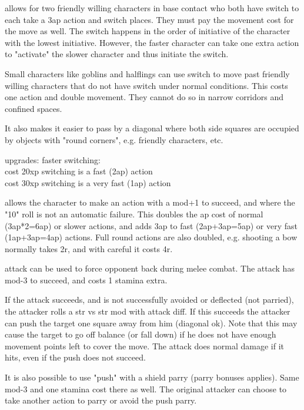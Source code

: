  allows for two friendly willing characters in base contact who both have switch to each take a 3ap action and switch places. They must pay the movement cost for the move as well. The switch happens in the order of initiative of the character with the lowest initiative. However, the faster character can take one extra action to "activate" the slower character and thus initiate the switch.

Small characters like goblins and halflings can use switch to move past friendly willing characters that do not have switch under normal conditions. This costs one action and double movement. They cannot do so in narrow corridors and confined spaces.

It also makes it easier to pass by a diagonal where both side squares are occupied by objects with "round corners", e.g. friendly characters, etc.

upgrades: faster switching: \\
cost 20xp switching is a fast (2ap) action \\
cost 30xp switching is a very fast (1ap) action


 allows the character to make an action with a mod+1 to succeed, and where the "10" roll is not an automatic failure.
This doubles the ap cost of normal (3ap*2=6ap) or slower actions, and adds 3ap to fast (2ap+3ap=5ap) or very fast (1ap+3ap=4ap) actions.
Full round actions are also doubled, e.g. shooting a bow normally takes 2r, and with careful it costs 4r.


 attack can be used to force opponent back during melee combat. The attack has mod-3 to succeed, and costs 1 stamina extra.

If the attack succeeds, and is not successfully avoided or deflected (not parried), the attacker rolls a str vs str mod with attack diff. If this succeeds the attacker can push the target one square away from him (diagonal ok). Note that this may cause the target to go off balance (or fall down) if he does not have enough movement points left to cover the move. The attack does normal damage if it hits, even if the push does not succeed.

It is also possible to use "push" with a shield parry (parry bonuses applies). Same mod-3 and one stamina cost there as well. The original attacker can choose to take another action to parry or avoid the push parry.


